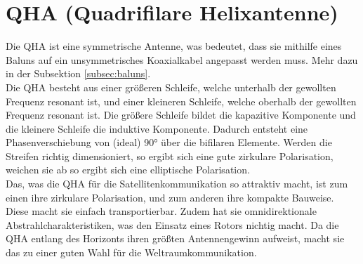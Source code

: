 \section{QHA (Quadrifilare Helixantenne)}
Die QHA ist eine symmetrische Antenne, was bedeutet, dass sie mithilfe eines Baluns auf ein unsymmetrisches Koaxialkabel angepasst werden muss. Mehr dazu in der Subsektion \ref{subsec:baluns}.\\

Die QHA besteht aus einer größeren Schleife, welche unterhalb der gewollten Frequenz resonant ist, und einer kleineren Schleife, welche oberhalb der gewollten Frequenz resonant ist. Die größere Schleife bildet die kapazitive Komponente und die kleinere Schleife die induktive Komponente. Dadurch entsteht eine Phasenverschiebung von (ideal) 90° über die bifilaren Elemente. Werden die Streifen richtig dimensioniert, so ergibt sich eine gute zirkulare Polarisation, weichen sie ab so ergibt sich eine elliptische Polarisation.\\

Das, was die QHA für die Satellitenkommunikation so attraktiv macht, ist zum einen ihre zirkulare Polarisation, und zum anderen ihre kompakte Bauweise. Diese macht sie einfach transportierbar. Zudem hat sie omnidirektionale Abstrahlcharakteristiken, was den Einsatz eines Rotors nichtig macht. Da die QHA entlang des Horizonts ihren größten Antennengewinn aufweist, macht sie das zu einer guten Wahl für die Weltraumkommunikation\cite{qfh_w3kh_nodate}.
